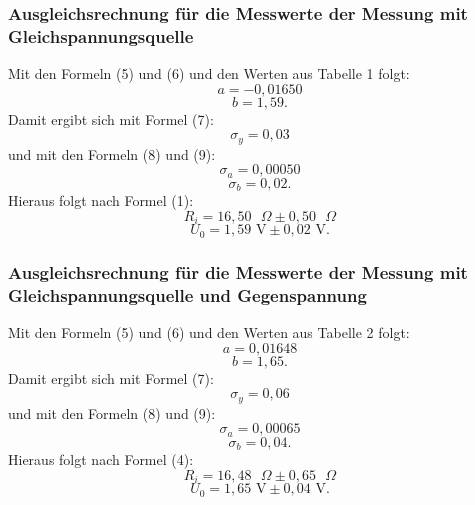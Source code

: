 \subsubsection{Ausgleichsrechnung für die Messwerte der Messung mit Gleichspannungsquelle}
Mit den Formeln (5) und (6) und den Werten aus Tabelle 1 folgt:
\begin{displaymath}
	a=-0,01650
\end{displaymath}
\begin{displaymath}
	b=1,59\text{.}
\end{displaymath}
Damit ergibt sich mit Formel (7):
\begin{displaymath}
	\sigma_y=0,03
\end{displaymath}
und mit den Formeln (8) und (9):
\begin{displaymath}
	\sigma_a=0,00050
\end{displaymath}
\begin{displaymath}
	\sigma_b=0,02\text{.}
\end{displaymath}
Hieraus folgt nach Formel (1):
\begin{displaymath}
	R_i=16,50\text{ }\Omega\pm 0,50\text{ }\Omega
\end{displaymath}
\begin{displaymath}
	U_0=1,59\text{ V}\pm 0,02\text{ V.}
\end{displaymath}

\subsubsection{Ausgleichsrechnung für die Messwerte der Messung mit Gleichspannungsquelle und Gegenspannung}

Mit den Formeln (5) und (6) und den Werten aus Tabelle 2 folgt:
\begin{displaymath}
a=0,01648
\end{displaymath}
\begin{displaymath}
b=1,65\text{.}
\end{displaymath}
Damit ergibt sich mit Formel (7):
\begin{displaymath}
\sigma_y=0,06
\end{displaymath}
und mit den Formeln (8) und (9):
\begin{displaymath}
\sigma_a=0,00065
\end{displaymath}
\begin{displaymath}
\sigma_b=0,04\text{.}
\end{displaymath}
Hieraus folgt nach Formel (4):
\begin{displaymath}
R_i=16,48\text{ }\Omega\pm 0,65 \text{ }\Omega
\end{displaymath}
\begin{displaymath}
U_0=1,65\text{ V}\pm 0,04\text{ V.}
\end{displaymath}

